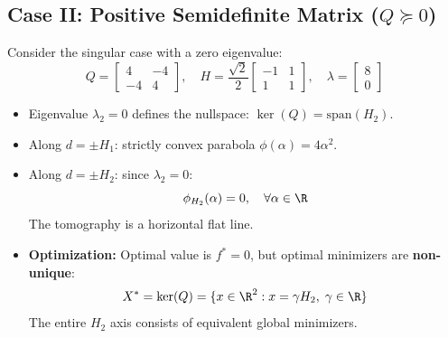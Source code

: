 \subsection{Case II: Positive Semidefinite Matrix (\texorpdfstring{$Q \succeq 0$}{Q >= 0})}
Consider the singular case with a zero eigenvalue:
\begin{equation}
Q = \begin{bmatrix} 4 & -4 \\ -4 & 4 \end{bmatrix}, \quad H = \frac{\sqrt{2}}{2} \begin{bmatrix} -1 & 1 \\ 1 & 1 \end{bmatrix}, \quad \lambda = \begin{bmatrix} 8 \\ 0 \end{bmatrix}
\end{equation}
\begin{itemize}
    \item Eigenvalue $\lambda_2 = 0$ defines the nullspace: $\ker(Q) = \text{span}(H_2)$.
    \item Along $d = \pm H_1$: strictly convex parabola $\phi(\alpha) = 4\alpha^2$.
    \item Along $d = \pm H_2$: since $\lambda_2 = 0$:
    \begin{equation}
    \phi_{H_2}(\alpha) = 0, \quad \forall \alpha \in \R
    \end{equation}
    The tomography is a horizontal flat line.
    \item \textbf{Optimization:} Optimal value is $f^* = 0$, but optimal minimizers are \textbf{non-unique}:
    \begin{equation}
    X^* = \ker(Q) = \{x \in \R^2 : x = \gamma H_2, \; \gamma \in \R\}
    \end{equation}
    The entire $H_2$ axis consists of equivalent global minimizers.
\end{itemize}


